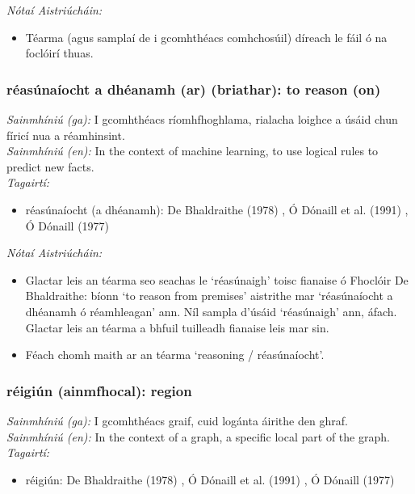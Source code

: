  \noindent \textit{Nótaí Aistriúcháin:}
\begin{itemize}
	\item Téarma (agus samplaí de i gcomhthéacs comhchosúil) díreach le fáil ó na foclóirí thuas.
\end{itemize}


\subsubsection*{réasúnaíocht a dhéanamh (ar) (briathar): to reason (on)}
 \noindent \textit{Sainmhíniú (ga):} I gcomhthéacs ríomhfhoghlama, rialacha loighce a úsáid chun fíricí nua a réamhinsint.
\\
 \noindent \textit{Sainmhíniú (en):} In the context of machine learning, to use logical rules to predict new facts.
\\
 \noindent \textit{Tagairtí:}
\begin{itemize}
	\item réasúnaíocht (a dhéanamh): De Bhaldraithe (1978) \cite{de-bhaldraithe}, Ó Dónaill et al. (1991) \cite{focloir-beag}, Ó Dónaill (1977) \cite{odonaill}
\end{itemize}

 \noindent \textit{Nótaí Aistriúcháin:}
\begin{itemize}
	\item Glactar leis an téarma seo seachas le `réasúnaigh' toisc fianaise ó Fhoclóir De Bhaldraithe: bíonn `to reason from premises' aistrithe mar `réasúnaíocht a dhéanamh ó réamhleagan' ann. Níl sampla d'úsáid `réasúnaigh' ann, áfach. Glactar leis an téarma a bhfuil tuilleadh fianaise leis mar sin.
	\item Féach chomh maith ar an téarma `reasoning / réasúnaíocht'.
\end{itemize}


\subsubsection*{réigiún (ainmfhocal): region}
 \noindent \textit{Sainmhíniú (ga):} I gcomhthéacs graif, cuid logánta áirithe den ghraf.
\\
 \noindent \textit{Sainmhíniú (en):} In the context of a graph, a specific local part of the graph.
\\
 \noindent \textit{Tagairtí:}
\begin{itemize}
	\item réigiún: De Bhaldraithe (1978) \cite{de-bhaldraithe}, Ó Dónaill et al. (1991) \cite{focloir-beag}, Ó Dónaill (1977) \cite{odonaill}
\end{itemize}

